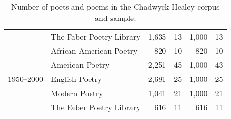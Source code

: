 \begin{table}[t]
{\begin{tabular}{llrrrr}
   & The Faber Poetry Library & 1,635 & 13 & 1,000 & 13 \\
  \cline{1-6}
  \multirow[t]{5}{*}{1950--2000} & African-American Poetry & 820 & 10 & 820 & 10 \\
   & American Poetry & 2,251 & 45 & 1,000 & 43 \\
   & English Poetry & 2,681 & 25 & 1,000 & 25 \\
   & Modern Poetry & 1,041 & 21 & 1,000 & 21 \\
   & The Faber Poetry Library & 616 & 11 & 616 & 11 \\
  \bottomrule
  \end{tabular}
  }
  \caption{Number of poets and poems in the Chadwyck-Healey corpus and sample.}
  \label{tab:num_poems_corpus}
\end{table}